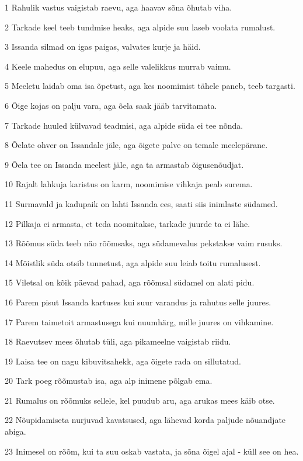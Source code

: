 \par 1 Rahulik vastus vaigistab raevu, aga haavav sõna õhutab viha.
\par 2 Tarkade keel teeb tundmise heaks, aga alpide suu laseb voolata rumalust.
\par 3 Issanda silmad on igas paigas, valvates kurje ja häid.
\par 4 Keele mahedus on elupuu, aga selle valelikkus murrab vaimu.
\par 5 Meeletu laidab oma isa õpetust, aga kes noomimist tähele paneb, teeb targasti.
\par 6 Õige kojas on palju vara, aga õela saak jääb tarvitamata.
\par 7 Tarkade huuled külvavad teadmisi, aga alpide süda ei tee nõnda.
\par 8 Õelate ohver on Issandale jäle, aga õigete palve on temale meelepärane.
\par 9 Õela tee on Issanda meelest jäle, aga ta armastab õigusenõudjat.
\par 10 Rajalt lahkuja karistus on karm, noomimise vihkaja peab surema.
\par 11 Surmavald ja kadupaik on lahti Issanda ees, saati siis inimlaste südamed.
\par 12 Pilkaja ei armasta, et teda noomitakse, tarkade juurde ta ei lähe.
\par 13 Rõõmus süda teeb näo rõõmsaks, aga südamevalus pekstakse vaim rusuks.
\par 14 Mõistlik süda otsib tunnetust, aga alpide suu leiab toitu rumalusest.
\par 15 Viletsal on kõik päevad pahad, aga rõõmsal südamel on alati pidu.
\par 16 Parem pisut Issanda kartuses kui suur varandus ja rahutus selle juures.
\par 17 Parem taimetoit armastusega kui nuumhärg, mille juures on vihkamine.
\par 18 Raevutsev mees õhutab tüli, aga pikameelne vaigistab riidu.
\par 19 Laisa tee on nagu kibuvitsahekk, aga õigete rada on sillutatud.
\par 20 Tark poeg rõõmustab isa, aga alp inimene põlgab ema.
\par 21 Rumalus on rõõmuks sellele, kel puudub aru, aga arukas mees käib otse.
\par 22 Nõupidamiseta nurjuvad kavatsused, aga lähevad korda paljude nõuandjate abiga.
\par 23 Inimesel on rõõm, kui ta suu oskab vastata, ja sõna õigel ajal - küll see on hea.
